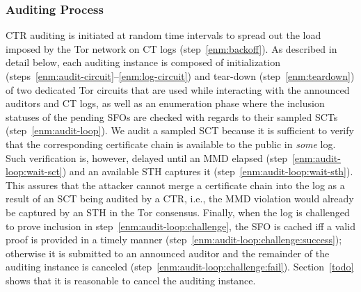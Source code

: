 \subsubsection{Auditing Process}
CTR auditing is initiated at random time intervals to spread out the load
imposed by the Tor network on CT logs (step~\ref{enm:backoff}).
As described in detail below, each auditing instance is composed of
	initialization (steps~\ref{enm:audit-circuit}--\ref{enm:log-circuit}) and
	tear-down (step~\ref{enm:teardown})
of two dedicated Tor circuits that are used while interacting with the announced
auditors and CT logs, as well as an enumeration phase where the
inclusion statuses of the pending SFOs are checked with regards to their sampled
SCTs (step~\ref{enm:audit-loop}).  We audit a sampled SCT because it is
sufficient to verify that the corresponding certificate chain is available to
the public in \emph{some} log.  Such verification is, however, delayed
until an MMD elapsed (step~\ref{enm:audit-loop:wait-sct}) and an available STH
captures it (step~\ref{enm:audit-loop:wait-sth}).
This assures that the attacker cannot merge a certificate chain into the log
as a result of an SCT being audited by a CTR, i.e., the MMD
violation would already be captured by an STH in the Tor consensus.
Finally, when the log is challenged to prove inclusion in
step~\ref{enm:audit-loop:challenge}, the SFO is cached iff a valid proof is
provided in a timely manner (step~\ref{enm:audit-loop:challenge:success});
otherwise it is submitted to an announced auditor and the remainder of the
auditing instance is canceled (step~\ref{enm:audit-loop:challenge:fail}).
Section~\ref{todo} shows that it is reasonable to cancel the auditing instance.




